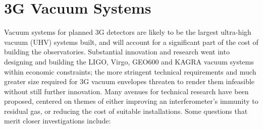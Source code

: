 \section{3G Vacuum Systems}
Vacuum systems for planned 3G detectors are likely to be the largest ultra-high vacuum (UHV) systems built, and will account for a significant part of the cost of building the observatories. Substantial innovation and research went into designing and building the LIGO, Virgo, GEO600 and KAGRA vacuum systems within economic constraints; the more stringent technical requirements and much greater size required for 3G vacuum envelopes threaten to render them infeasible without still further innovation. Many avenues for technical research have been proposed,  centered on themes of either improving an interferometer’s immunity to residual gas, or reducing the cost of suitable installations. Some questions that merit closer investigations include:

